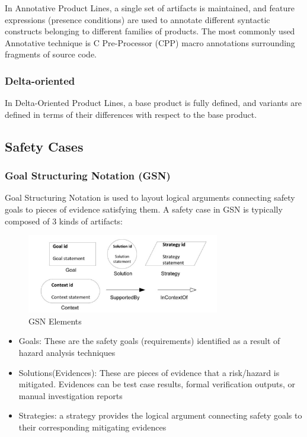 \documentclass[11pt]{article}
\begin{document}
In Annotative Product Lines, a single set of artifacts is maintained, and feature expressions (presence conditions) are used to annotate different syntactic constructs belonging to different families of products. The most commonly used Annotative technique is C Pre-Processor (CPP) macro annotations surrounding fragments of source code.

\subsubsection{Delta-oriented}

In Delta-Oriented Product Lines, a base product is fully defined, and variants are defined in terms of their differences with respect to the base product. 

\subsection{Safety Cases}

\subsubsection{Goal Structuring Notation (GSN)}

Goal Structuring Notation is used to layout logical arguments connecting safety goals to pieces of evidence satisfying them. A safety case in GSN is typically composed of 3 kinds of artifacts:

\begin{figure}
  \centering
  \includegraphics[width=0.75\textwidth]{gsn}
  \caption{GSN Elements}
\end{figure}

\begin{itemize}
\item Goals: These are the safety goals (requirements) identified as a result of hazard analysis techniques
\item Solutions(Evidences): These are pieces of evidence that a risk/hazard is mitigated. Evidences can be test case results, formal verification outputs, or manual investigation reports
\item Strategies: a strategy provides the logical argument connecting safety goals to their corresponding mitigating evidences
\end{itemize}
\end{document}
